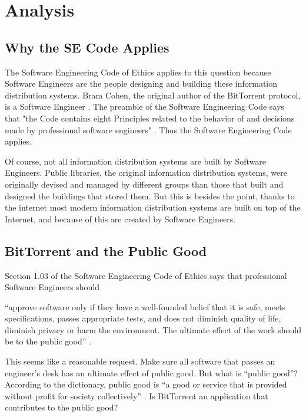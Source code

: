 \documentclass[11pt]{article}
\begin{document}
\section{Analysis}

\subsection{Why the SE Code Applies}

The Software Engineering Code of Ethics applies to this question because Software Engineers are the people designing and building these information distribution systems. Bram Cohen, the original author of the BitTorrent protocol, is a Software Engineer \cite{cohen}. The preamble of the Software Engineering Code says that "the Code contains eight Principles related to the behavior of and decisions made by professional software engineers" \cite{secode}. Thus the Software Engineering Code applies.

Of course, not all information distribution systems are built by Software Engineers. Public libraries, the original information distribution systems, were originally devised and managed by different groups than those that built and designed the buildings that stored them. But this is besides the point, thanks to the internet most modern information distribution systems are built on top of the Internet, and because of this are created by Software Engineers.

\subsection{BitTorrent and the Public Good}

Section 1.03 of the Software Engineering Code of Ethics says that professional Software Engineers should

{\addtolength{\leftskip}{6mm}
\noindent ``approve software only if they have a well-founded belief that it is safe, meets specifications, passes appropriate tests, and does not diminish quality of life, diminish privacy or harm the environment. The ultimate effect of the work should be to the public good'' \cite[1.03]{secode}.
}

This seems like a reasonable request. Make sure all software that passes an engineer's desk has an ultimate effect of public good. But what is ``public good''? According to the dictionary, public good is ``a good or service that is provided without profit for society collectively'' \cite{pubgooddef}. Is BitTorrent an application that contributes to the public good?
\end{document}
